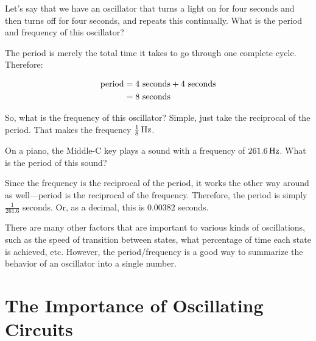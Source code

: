 \begin{exampleprob}
Let's say that we have an oscillator that turns a light on for four seconds and then turns off for four seconds, and repeats this continually.
What is the period and frequency of this oscillator?

The period is merely the total time it takes to go through one complete cycle.
Therefore:

\begin{align*}
\textrm{period} &= 4\textrm{ seconds} + 4\textrm{ seconds} \\
  &= 8\textrm{ seconds}
\end{align*}

So, what is the frequency of this oscillator?  Simple, just take the reciprocal of the period.  That makes the frequency $\frac{1}{8}\,\si{\hertz}$.
\end{exampleprob} 

\begin{exampleprob}
On a piano, the Middle-C key plays a sound with a frequency of $261.6\,\si{\hertz}$.
What is the period of this sound?

Since the frequency is the reciprocal of the period, it works the other way around as well---period is the reciprocal of the frequency.
Therefore, the period is simply $\frac{1}{261.6}$ seconds.
Or, as a decimal, this is $0.00382$ seconds.
\end{exampleprob}

There are many other factors that are important to various kinds of oscillations, such as the speed of transition between states, what percentage of time each state is achieved, etc.
However, the period/frequency is a good way to summarize the behavior of an oscillator into a single number.

\section{The Importance of Oscillating Circuits}


